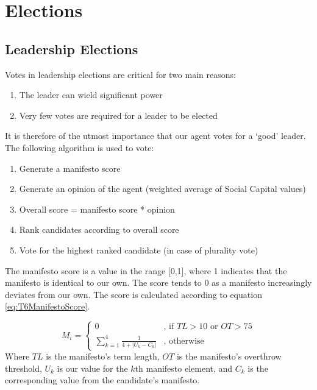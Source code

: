 \section{Elections}

\subsection{Leadership Elections}

Votes in leadership elections are critical for two main reasons:
\begin{enumerate}
    \item The leader can wield significant power
    \item Very few votes are required for a leader to be elected
\end{enumerate}
It is therefore of the utmost importance that our agent votes for a `good' leader. The following algorithm is used to vote:
\begin{enumerate}
    \item Generate a manifesto score
    \item Generate an opinion of the agent (weighted average of Social Capital values)
    \item Overall score = manifesto score * opinion
    \item Rank candidates according to overall score
    \item Vote for the highest ranked candidate (in case of plurality vote)
\end{enumerate}
The manifesto score is a value in the range [0,1], where 1 indicates that the manifesto is identical to our own. The score tends to 0 as a manifesto increasingly deviates from our own. The score is calculated according to equation \ref{eq:T6ManifestoScore}.

\begin{equation}\label{eq:T6ManifestoScore}
    M_{i}=\left\{
    	\begin{array}{ll}
    		0 & \mbox{, if } TL > 10 \mbox{ or } OT > 75 \\
    	  \sum_{k=1}^{4}\frac{1}{4+\left | U_{k} - C_{k} \right |} & \mbox{, otherwise} 
    	\end{array}\right.
\end{equation}
Where $TL$ is the manifesto's term length, $OT$ is the manifesto's overthrow threshold, $U_k$ is our value for 
the $k$th manifesto element, and $C_k$ is the corresponding value from the candidate's manifesto.\\

